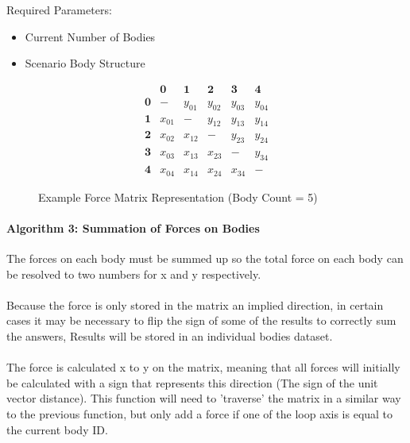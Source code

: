 Required Parameters:
\begin{itemize}
\item Current Number of Bodies
\item Scenario Body Structure
\end{itemize}

\begin{figure}[!ht]
  \centering
  $$\begin{array}{c|c|c|c|c|c}
  ~ & \textbf{0} & \textbf{1} & \textbf{2} & \textbf{3} & \textbf{4} \\ 
  \hline
  \textbf{0} & -      & y_{01} & y_{02} & y_{03} & y_{04} \\
  \hline
  \textbf{1} & x_{01} & -      & y_{12} & y_{13} & y_{14} \\
  \hline
  \textbf{2} & x_{02} & x_{12} & -      & y_{23} & y_{24} \\
  \hline
  \textbf{3} & x_{03} & x_{13} & x_{23} & -      & y_{34} \\
  \hline
  \textbf{4} & x_{04} & x_{14} & x_{24} & x_{34} & -
 \end{array}$$
  \caption{Example Force Matrix Representation (Body Count = 5)}
\end{figure}

\paragraph{Algorithm 3: Summation of Forces on Bodies}
The forces on each body must be summed up so the total force on each body can be resolved to two numbers for x and y respectively.

\paragraph{}
Because the force is only stored in the matrix an implied direction, in certain cases it may be necessary to flip the sign of some of the results to correctly sum the answers, Results will be stored in an individual bodies dataset.

\paragraph{}
The force is calculated x to y on the matrix, meaning that all forces will initially be calculated with a sign that represents this direction (The sign of the unit vector distance).
This function will need to 'traverse' the matrix in a similar way to the previous function, but only add a force if one of the loop axis is equal to the current body ID.

